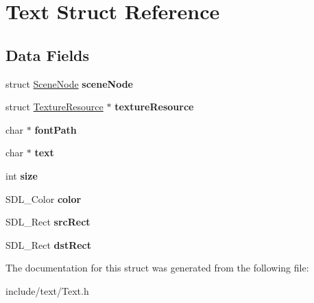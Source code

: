 \hypertarget{struct_text}{}\section{Text Struct Reference}
\label{struct_text}
\subsection*{Data Fields}
\begin{DoxyCompactItemize}
\item 
\hypertarget{struct_text_aca8025f56fb4ce20b974ec9a3292a9e4}{}\label{struct_text_aca8025f56fb4ce20b974ec9a3292a9e4} 
struct \hyperlink{struct_scene_node}{Scene\+Node} {\bfseries scene\+Node}
\item 
\hypertarget{struct_text_aedd0da0c072332f83e64105f8682bbdf}{}\label{struct_text_aedd0da0c072332f83e64105f8682bbdf} 
struct \hyperlink{struct_texture_resource}{Texture\+Resource} $\ast$ {\bfseries texture\+Resource}
\item 
\hypertarget{struct_text_aed16a68b0664f36f420ddefb18c7a640}{}\label{struct_text_aed16a68b0664f36f420ddefb18c7a640} 
char $\ast$ {\bfseries font\+Path}
\item 
\hypertarget{struct_text_a5633b1433389cec21ade3811bbe9ca5b}{}\label{struct_text_a5633b1433389cec21ade3811bbe9ca5b} 
char $\ast$ {\bfseries text}
\item 
\hypertarget{struct_text_a439227feff9d7f55384e8780cfc2eb82}{}\label{struct_text_a439227feff9d7f55384e8780cfc2eb82} 
int {\bfseries size}
\item 
\hypertarget{struct_text_a631bf4babe4c1825a2cdc0c19c2bd04f}{}\label{struct_text_a631bf4babe4c1825a2cdc0c19c2bd04f} 
S\+D\+L\+\_\+\+Color {\bfseries color}
\item 
\hypertarget{struct_text_a0717c803d1a988e69bf04032a0a1adb6}{}\label{struct_text_a0717c803d1a988e69bf04032a0a1adb6} 
S\+D\+L\+\_\+\+Rect {\bfseries src\+Rect}
\item 
\hypertarget{struct_text_a80f3f86b8f750b604dd07a40509447e0}{}\label{struct_text_a80f3f86b8f750b604dd07a40509447e0} 
S\+D\+L\+\_\+\+Rect {\bfseries dst\+Rect}
\end{DoxyCompactItemize}


The documentation for this struct was generated from the following file\+:\begin{DoxyCompactItemize}
\item 
include/text/Text.\+h\end{DoxyCompactItemize}
